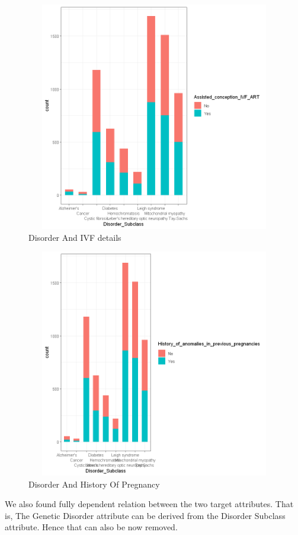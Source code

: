 \begin{figure}[htpb]
	\centering
	\includegraphics[height=10cm, width=12cm]{figures/ivf.png}
	\caption{Disorder And IVF details}
	\label{fig 15}
\end{figure}
\begin{figure}[htpb]
	\centering
	\includegraphics[height=10cm, width=12cm]{figures/preg.png}
	\caption{Disorder And History Of Pregnancy}
	\label{fig 16}
\end{figure}
\newpage
\noindent
We also found fully dependent relation between the two target attributes. That is, The Genetic Disorder attribute can be derived from the Disorder Subclass attribute. Hence that can also be now removed.
